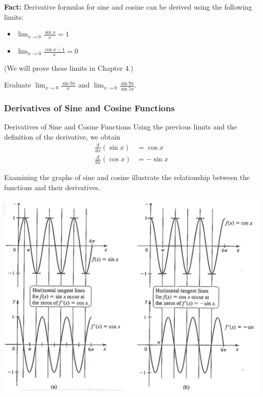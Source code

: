 \documentclass[cal1spr16Lectures.tex]{subfiles}
\begin{document}
\begin{frame}{}{}
{\bf Fact:} Derivative formulas for sine and cosine can be derived using the following limits:
\begin{itemize}
	\item $\lim_{x \to 0} \frac{\sin x}{x}=1$
	\item $\lim_{x \to 0} \frac{\cos x -1}{x}=0$
\end{itemize}
(We will prove these limits in Chapter 4.)
\end{frame}

\begin{frame}
\begin{exe} Evaluate $\displaystyle\lim_{x \to 0} \frac{\sin 9x}{x}$ and $\displaystyle\lim_{x \to 0} \frac{\sin 9x}{\sin 5x}.$ \end{exe}
\end{frame}

\subsubsection{Derivatives of Sine and Cosine Functions}

\begin{frame}{\small Derivatives of Sine and Cosine Functions}
Using the previous limits and the definition of the derivative, we obtain
\begin{align*}
\frac{d}{dx} (\sin x) &= \cos x \\
\frac{d}{dx} (\cos x) &= -\sin x
\end{align*}
\end{frame}

\begin{frame}
Examining the graphs of sine and cosine illustrate the relationship between the functions and their derivatives.

\begin{center}
\includegraphics[scale=0.9]{pictures/Ch3sineCosine}
\end{center}
\end{frame}
\end{document}
